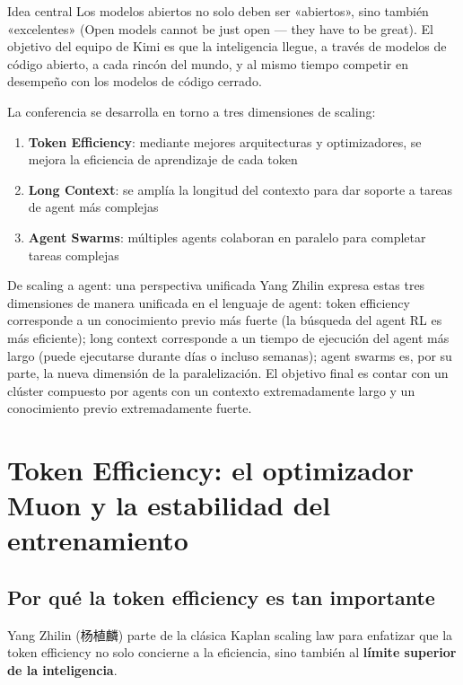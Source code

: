 \documentclass[a4paper]{article}
\begin{document}
\begin{importantbox}{Idea central}
Los modelos abiertos no solo deben ser «abiertos», sino también «excelentes» (Open models cannot be just open --- they have to be great). El objetivo del equipo de Kimi es que la inteligencia llegue, a través de modelos de código abierto, a cada rincón del mundo, y al mismo tiempo competir en desempeño con los modelos de código cerrado.
\end{importantbox}

La conferencia se desarrolla en torno a tres dimensiones de scaling:
\begin{enumerate}
    \item \textbf{Token Efficiency}: mediante mejores arquitecturas y optimizadores, se mejora la eficiencia de aprendizaje de cada token
    \item \textbf{Long Context}: se amplía la longitud del contexto para dar soporte a tareas de agent más complejas
    \item \textbf{Agent Swarms}: múltiples agents colaboran en paralelo para completar tareas complejas
\end{enumerate}

\begin{knowledgebox}{De scaling a agent: una perspectiva unificada}
Yang Zhilin expresa estas tres dimensiones de manera unificada en el lenguaje de agent: token efficiency corresponde a un conocimiento previo más fuerte (la búsqueda del agent RL es más eficiente); long context corresponde a un tiempo de ejecución del agent más largo (puede ejecutarse durante días o incluso semanas); agent swarms es, por su parte, la nueva dimensión de la paralelización. El objetivo final es contar con un clúster compuesto por agents con un contexto extremadamente largo y un conocimiento previo extremadamente fuerte.
\end{knowledgebox}

\section{Token Efficiency: el optimizador Muon y la estabilidad del entrenamiento}

\subsection{Por qué la token efficiency es tan importante}

Yang Zhilin (杨植麟) parte de la clásica Kaplan scaling law para enfatizar que la token efficiency no solo concierne a la eficiencia, sino también al \textbf{límite superior de la inteligencia}.
\end{document}
